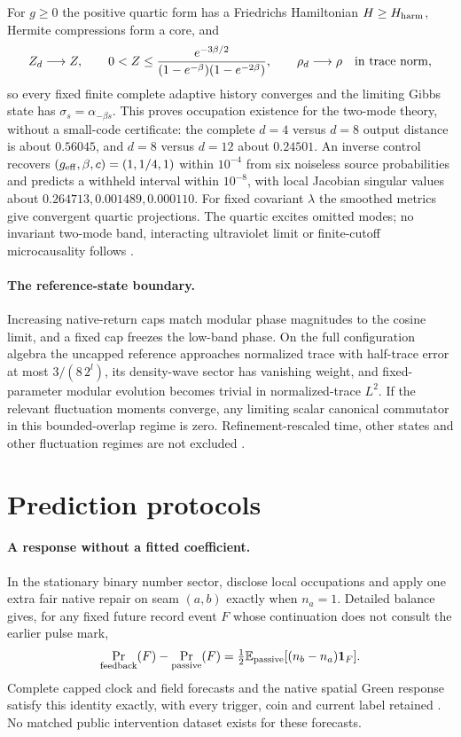 \documentclass[11pt]{article}
\theoremstyle{definition}
\theoremstyle{remark}
\theoremstyle{plain}
\newcommand{\Ex}{\mathbb{E}}
\begin{document}
For $g\ge0$ the positive quartic form has a Friedrichs Hamiltonian
$H\ge H_{\rm harm}$, Hermite compressions form a core, and
\[
 Z_d\longrightarrow Z,\qquad
 0<Z\le\frac{e^{-3\beta/2}}{(1-e^{-\beta})(1-e^{-2\beta})},
 \qquad \rho_d\longrightarrow\rho\quad\hbox{in trace norm},
\]
so every fixed finite complete adaptive history converges and the limiting
Gibbs state has $\sigma_s=\alpha_{-\beta s}$. This proves occupation existence
for the two-mode theory, without a small-code certificate: the complete
$d=4$ versus $d=8$ output distance is about $0.56045$, and $d=8$ versus
$d=12$ about $0.24501$. An inverse control recovers
$(g_{\rm eff},\beta,c)=(1,1/4,1)$ within $10^{-4}$ from six noiseless source
probabilities and predicts a withheld interval within $10^{-8}$, with local
Jacobian singular values about $0.264713,0.001489,0.000110$. For fixed
covariant $\lambda$ the smoothed metrics give convergent quartic projections.
The quartic excites omitted modes; no invariant two-mode band, interacting
ultraviolet limit or finite-cutoff microcausality follows
\cite{mCONSTRUCTION}.

\paragraph{The reference-state boundary.}
Increasing native-return caps match modular phase magnitudes to the cosine
limit, and a fixed cap freezes the low-band phase. On the full configuration
algebra the uncapped reference approaches normalized trace with half-trace
error at most $3/(8\,2^l)$, its density-wave sector has vanishing weight, and
fixed-parameter modular evolution becomes trivial in normalized-trace $L^2$.
If the relevant fluctuation moments converge, any limiting scalar canonical
commutator in this bounded-overlap regime is zero. Refinement-rescaled time,
other states and other fluctuation regimes are not excluded
\cite{nativeContinuum}.



\section{Prediction protocols}
\label{sec:prediction}

\paragraph{A response without a fitted coefficient.}
In the stationary binary number sector, disclose local occupations and
apply one extra fair native repair on seam $(a,b)$ exactly when $n_a=1$.
Detailed balance gives, for any fixed future record event $F$ whose
continuation does not consult the earlier pulse mark,
\[
 \Pr_{\rm feedback}(F)-\Pr_{\rm passive}(F)
 =\tfrac12\Ex_{\rm passive}[(n_b-n_a)\mathbf1_F].
\]
Complete capped clock and field forecasts and the native spatial Green
response satisfy this identity exactly, with every trigger, coin and current
label retained \cite{nativeContinuum}. No matched public intervention dataset
exists for these forecasts.
\end{document}
